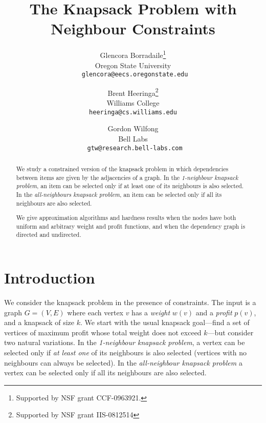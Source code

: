 \documentclass[12pt]{article}
\begin{document}
\title{The Knapsack Problem with Neighbour Constraints}

\author{Glencora Borradaile\footnote{Supported
by NSF grant CCF-0963921.}\\Oregon State University\\{\tt
glencora@eecs.oregonstate.edu} \and Brent
Heeringa\footnote{Supported by NSF grant IIS-0812514}\\Williams College\\{\tt heeringa@cs.williams.edu} \and
Gordon Wilfong\\Bell Labs\\ {\tt
gtw@research.bell-labs.com}}

\maketitle


\begin{abstract}
We study a constrained version of the knapsack problem in which
dependencies between items are given by the adjacencies of a graph.  In the {\em 1-neighbour knapsack problem}, an item can be selected only if at least one of its neighbours is also
selected.  In the {\em all-neighbours knapsack problem}, an item can be selected only if all its neighbours are also selected.

We give approximation algorithms and
hardness results when the nodes have both uniform and arbitrary
weight and profit functions, and when the dependency graph is
directed and undirected.
\end{abstract}


\newpage

\section{Introduction}

We consider the knapsack problem in the presence of constraints.  The input is a graph $G = (V,E)$ where each vertex $v$ has a {\em weight} $w(v)$ and a {\em profit} $p(v)$, and a knapsack of size $k$.  We start with the usual knapsack goal---find a set of vertices of maximum profit whose total weight does not exceed $k$---but consider two natural variations.  In the {\em 1-neighbour knapsack problem}, a vertex can be selected only if {\em at least one} of its neighbours is also selected (vertices with no neighbours can always be selected).  In the {\em all-neighbour knapsack problem} a vertex can be selected only if all its neighbours are also selected.
\end{document}
